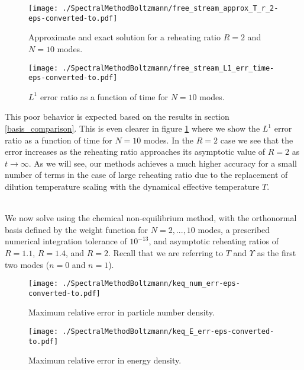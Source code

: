 \begin{figure}[H]
\begin{minipage}[t]{0.5\linewidth}
\centerline{\texttt{[image: ./SpectralMethodBoltzmann/free\_stream\_approx\_T\_r\_2-eps-converted-to.pdf]}}
\caption{Approximate and exact solution for a reheating ratio $R=2$ and $N=10$ modes.}\label{fig:free_stream_approx_T_r_2}
 \end{minipage}
 \hspace{0.5cm}
 \begin{minipage}[t]{0.5\linewidth}
\centerline{\texttt{[image: ./SpectralMethodBoltzmann/free\_stream\_L1\_err\_time-eps-converted-to.pdf]}}
\caption{$L^1$ error ratio as a function of time for $N=10$ modes.}\label{fig:free_stream_L1_err_time}
 \end{minipage}
 \end{figure}

This poor behavior is expected based on the results in section \ref{basis_comparison}.  This is even clearer in figure \ref{fig:free_stream_L1_err_time} where we show the $L^1$ error ratio as a function of time for $N=10$ modes. In the $R=2$ case we see that the error increases as the reheating ratio approaches its asymptotic value of $R=2$ as $t\rightarrow\infty$.  As we will see, our methods achieves a much higher accuracy for a small number of terms in the case of large reheating ratio due to the replacement of dilution temperature scaling with the dynamical effective temperature $T$.  


\\
We now solve   using the chemical non-equilibrium method, with the orthonormal basis defined by the weight function  for $N=2,...,10$ modes, a prescribed numerical integration tolerance of $10^{-13}$, and asymptotic reheating ratios of $R=1.1$, $R=1.4$, and $R=2$.  Recall that we are referring to $T$ and $\Upsilon$ as the first two modes ($n=0$ and $n=1$). 

\begin{figure}[H]
 \begin{minipage}[b]{0.5\linewidth}
\centerline{\texttt{[image: ./SpectralMethodBoltzmann/keq\_num\_err-eps-converted-to.pdf]}}
\caption{Maximum relative error in particle number density.}\label{fig:keq_num_err}
 \end{minipage}
 \hspace{0.5cm}
 \begin{minipage}[b]{0.5\linewidth}
\centerline{\texttt{[image: ./SpectralMethodBoltzmann/keq\_E\_err-eps-converted-to.pdf]}}
\caption{Maximum relative error in energy density.}\label{fig:keq_E_err}
 \end{minipage}
 \end{figure}


